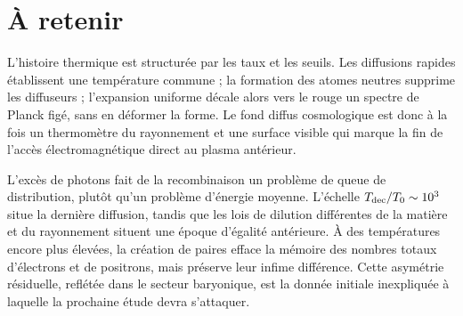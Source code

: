 \begin{classroomqa}
\end{classroomqa}

\section{À retenir}

L’histoire thermique est structurée par les taux et les seuils. Les diffusions rapides établissent une température commune ; la formation des atomes neutres supprime les diffuseurs ; l’expansion uniforme décale alors vers le rouge un spectre de Planck figé, sans en déformer la forme. Le fond diffus cosmologique est donc à la fois un thermomètre du rayonnement et une surface visible qui marque la fin de l’accès électromagnétique direct au plasma antérieur.

L’excès de photons fait de la recombinaison un problème de queue de distribution, plutôt qu’un problème d’énergie moyenne. L’échelle \(T_{\rm dec}/T_0\sim10^3\) situe la dernière diffusion, tandis que les lois de dilution différentes de la matière et du rayonnement situent une époque d’égalité antérieure. À des températures encore plus élevées, la création de paires efface la mémoire des nombres totaux d’électrons et de positrons, mais préserve leur infime différence. Cette asymétrie résiduelle, reflétée dans le secteur baryonique, est la donnée initiale inexpliquée à laquelle la prochaine étude devra s’attaquer.